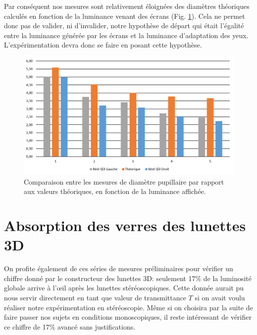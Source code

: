 	\par Par conséquent nos mesures sont relativement éloignées des diamètres théoriques calculés en fonction de la luminance venant des écrans (Fig. \ref{fig:resultats_mesure_pupille}). Cela ne permet donc pas de valider, ni d'invalider, notre hypothèse de départ qui était l'égalité entre la luminance générée par les écrans et la luminance d'adaptation des yeux. L'expérimentation devra donc se faire en posant cette hypothèse.
	
	\begin{figure}[h]
		\centering
		\includegraphics[scale=.75]{Figures/ComparaisonDiamReelDiamTheo}
		\caption{Comparaison entre les mesures de diamètre pupillaire par rapport aux valeurs théoriques, en fonction de la luminance affichée.}
		\label{fig:resultats_mesure_pupille}
	\end{figure}
	
	\section{Absorption des verres des lunettes 3D}
	\par On profite également de ces séries de mesures préliminaires pour vérifier un chiffre donné par le constructeur des lunettes 3D: seulement 17\% de la luminosité globale arrive à l'œil après les lunettes stéréoscopiques. Cette donnée aurait pu nous servir directement en tant que valeur de transmittance $T$ si on avait voulu réaliser notre expérimentation en stéréoscopie. Même si on choisira par la suite de faire passer nos sujets en conditions monoscopiques, il reste intéressant de vérifier ce chiffre de 17\% avancé sans justifications.
	
